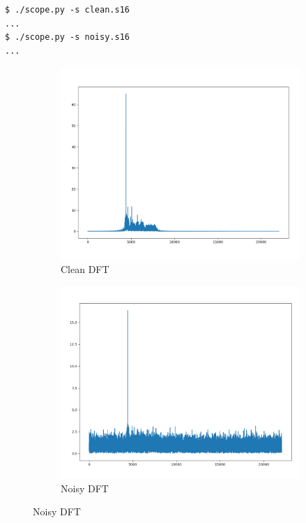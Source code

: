 \documentclass[a4paper]{article}
\begin{document}
\begin{lstlisting}
$ ./scope.py -s clean.s16
...
$ ./scope.py -s noisy.s16
...
\end{lstlisting}

\begin{figure}[H]
    \centering
    \begin{subfigure}[b]{0.45\textwidth}
        \includegraphics[width=1\textwidth]{dft_clean.png}
        \caption{Clean DFT}
    \end{subfigure}
    \begin{subfigure}[b]{0.45\textwidth}
        \includegraphics[width=1\textwidth]{dft_noisy.png}
        \caption{Noisy DFT}
    \end{subfigure}
\end{figure}
\end{document}
